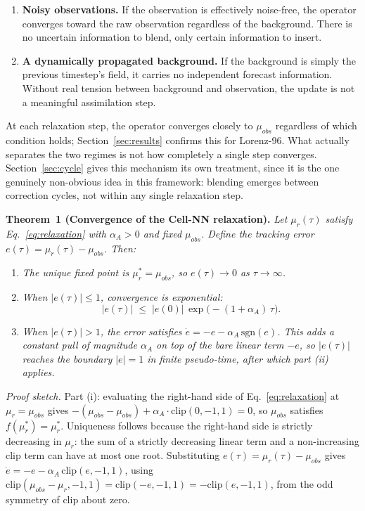 \documentclass[final,5p,times,twocolumn,authoryear]{elsarticle}
\begin{document}
\begin{enumerate}
\item \textbf{Noisy observations.} If the observation is effectively
noise-free, the operator converges toward the raw observation
regardless of the background. There is no uncertain information to
blend, only certain information to insert.
\item \textbf{A dynamically propagated background.} If the
background is simply the previous timestep's field, it carries no
independent forecast information. Without real tension between
background and observation, the update is not a meaningful
assimilation step.
\end{enumerate}

At each relaxation step, the operator converges closely to
$\mu_{obs}$ regardless of which condition holds;
Section~\ref{sec:results} confirms this for Lorenz-96. What actually
separates the two regimes is not how completely a single step
converges. Section~\ref{sec:cycle} gives this mechanism its own
treatment, since it is the one genuinely non-obvious idea in this
framework: blending emerges between correction cycles, not within
any single relaxation step.

\medskip
\noindent\textbf{Theorem~1 (Convergence of the Cell-NN relaxation).}
\textit{Let $\mu_r(\tau)$ satisfy Eq.~\eqref{eq:relaxation} with
$\alpha_A > 0$ and fixed $\mu_{obs}$. Define the tracking error
$e(\tau) = \mu_r(\tau) - \mu_{obs}$. Then:}
\begin{enumerate}
\item[(i)] \textit{The unique fixed point is $\mu_r^{\ast} = \mu_{obs}$,
so $e(\tau) \to 0$ as $\tau \to \infty$.}
\item[(ii)] \textit{When $|e(\tau)| \leq 1$, convergence is exponential:}
\begin{equation}
|e(\tau)| \;\leq\; |e(0)|\,\exp\!\bigl(-(1+\alpha_A)\,\tau\bigr).
\label{eq:convergence_rate}
\end{equation}
\item[(iii)] \textit{When $|e(\tau)| > 1$, the error satisfies
$\dot{e} = -e - \alpha_A\,\mathrm{sgn}(e)$. This adds a constant pull
of magnitude $\alpha_A$ on top of the bare linear term $-e$, so
$|e(\tau)|$ reaches the boundary $|e|=1$ in finite pseudo-time, after
which part (ii) applies.}
\end{enumerate}

\noindent\textit{Proof sketch.}
Part (i): evaluating the right-hand side of
Eq.~\eqref{eq:relaxation} at $\mu_r=\mu_{obs}$ gives
$-(\mu_{obs}-\mu_{obs}) + \alpha_A\cdot\mathrm{clip}(0,-1,1) = 0$,
so $\mu_{obs}$ satisfies $f(\mu_r^{\ast})=\mu_r^{\ast}$. Uniqueness
follows because the right-hand side is strictly decreasing in
$\mu_r$: the sum of a strictly decreasing linear term and a
non-increasing clip term can have at most one root. Substituting
$e(\tau) = \mu_r(\tau) - \mu_{obs}$ gives $\dot{e} = -e -
\alpha_A\,\mathrm{clip}(e,-1,1)$, using
$\mathrm{clip}(\mu_{obs}-\mu_r,-1,1) = \mathrm{clip}(-e,-1,1) =
-\mathrm{clip}(e,-1,1)$, from the odd symmetry of clip about zero.
\end{document}
